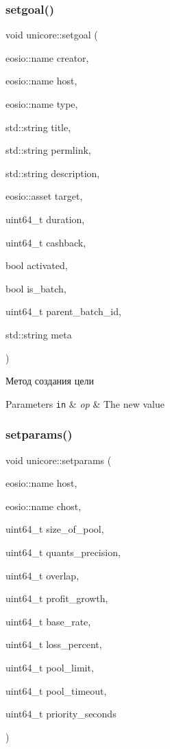 \subsubsection{\texorpdfstring{setgoal()}{setgoal()}}
{\footnotesize\ttfamily void unicore\+::setgoal (\begin{DoxyParamCaption}\item[{eosio\+::name}]{creator,  }\item[{eosio\+::name}]{host,  }\item[{eosio\+::name}]{type,  }\item[{std\+::string}]{title,  }\item[{std\+::string}]{permlink,  }\item[{std\+::string}]{description,  }\item[{eosio\+::asset}]{target,  }\item[{uint64\+\_\+t}]{duration,  }\item[{uint64\+\_\+t}]{cashback,  }\item[{bool}]{activated,  }\item[{bool}]{is\+\_\+batch,  }\item[{uint64\+\_\+t}]{parent\+\_\+batch\+\_\+id,  }\item[{std\+::string}]{meta }\end{DoxyParamCaption})}



Метод создания цели 


\begin{DoxyParams}[1]{Parameters}
\mbox{\tt in}  & {\em op} & The new value \\
\hline
\end{DoxyParams}
\mbox{\label{classunicore_accfb2e432f24f46fe7432110f0361d2f}} 
\subsubsection{\texorpdfstring{setparams()}{setparams()}}
{\footnotesize\ttfamily void unicore\+::setparams (\begin{DoxyParamCaption}\item[{eosio\+::name}]{host,  }\item[{eosio\+::name}]{chost,  }\item[{uint64\+\_\+t}]{size\+\_\+of\+\_\+pool,  }\item[{uint64\+\_\+t}]{quants\+\_\+precision,  }\item[{uint64\+\_\+t}]{overlap,  }\item[{uint64\+\_\+t}]{profit\+\_\+growth,  }\item[{uint64\+\_\+t}]{base\+\_\+rate,  }\item[{uint64\+\_\+t}]{loss\+\_\+percent,  }\item[{uint64\+\_\+t}]{pool\+\_\+limit,  }\item[{uint64\+\_\+t}]{pool\+\_\+timeout,  }\item[{uint64\+\_\+t}]{priority\+\_\+seconds }\end{DoxyParamCaption})}



